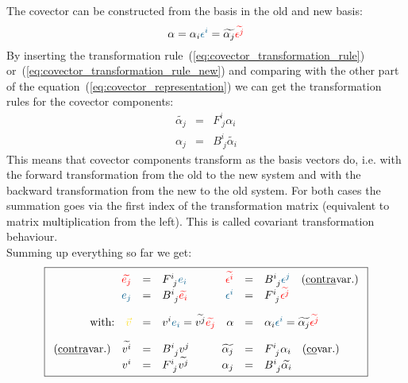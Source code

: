 The covector can be constructed from the basis in the old and new basis:
\begin{equation}
    \label{eq:covector_representation}
    \alpha = \alpha_i\hdcbvc{i} = \widetilde{\alpha_j}\hdcbtvc{j}
\end{equation}
By inserting the transformation rule~(\ref{eq:covector_transformation_rule})
or~(\ref{eq:covector_transformation_rule_new}) and comparing with the other part of the
equation~(\ref{eq:covector_representation}) we can get the transformation rules for the
covector components:
\begin{equation}
    \label{eq:covector_component_trafo}
    \begin{array}{rclrcl}
      \widetilde{\alpha_j} & = & F^{i~}_{~j}\alpha_i \\
      \alpha_j & = & B^{i~}_{~j}\widetilde{\alpha_i}
    \end{array}
  \end{equation}
  This means that covector components transform as the basis vectors do, i.e. with the
  forward transformation from the old to the new system and with the backward
  transformation from the new to the old system. For both cases the summation goes via the
  first index of the transformation matrix (equivalent to matrix multiplication from the
  left). This is called covariant transformation behaviour.\\

  Summing up everything so far we get:
  \begin{equation}
    \label{eq:summary_transformations}
    \boxed{
    \begin{array}{rclrcl}
      \hdbtvc{j} & = & F^{i~}_{~j}\hdbvc{i}
      \qquad \hfill
      \hdcbtvc{i} & = & B^{i~}_{~j} \hdcbvc{j}
      \quad\text{(\underline{contra}var.)} \\
      \hdbvc{j} & = & B^{i~}_{~j}\hdbtvc{i}
      \qquad\hfill
      \hdcbvc{i} & = &  F^{i~}_{~j} \hdcbtvc{j} \hfill \\
      \noalign{\vskip10pt}
      \text{with:}\quad \hdv & = & \hdvc{i} \hdbvc{i} = \hdtvc{j} \hdbtvc{j}
      \quad
      \alpha & = & \alpha_i\hdcbvc{i} = \widetilde{\alpha_j}\hdcbtvc{j}
      \hfill \\
      \noalign{\vskip10pt}
      \text{(\underline{contra}var.)}\quad
      \hdtvc{i} & = & B^{i~}_{~j} \hdvc{j}
      \qquad\hfill
      \widetilde{\alpha_j} & = & F^{i~}_{~j}\alpha_i
      \quad\text{(\underline{co}var.)}\hfill \\
      \hdvc{i} & = &  F^{i~}_{~j} \hdtvc{j}
      \qquad\hfill
      \alpha_j & = & B^{i~}_{~j}\widetilde{\alpha_i}\hfill
    \end{array}
    }
  \end{equation}

\newpage
